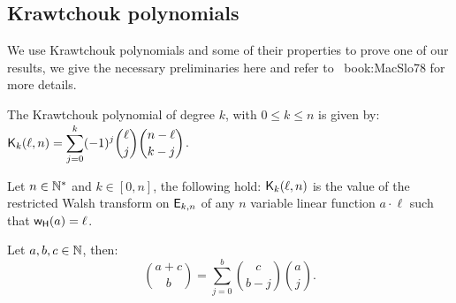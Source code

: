 \documentclass[11pt]{llncs}
\begin{document}
\subsection{Krawtchouk polynomials}
We use Krawtchouk polynomials and some of their properties to prove one of our results, we give the necessary preliminaries here and refer to \eg ~{book:MacSlo78} for more details.

\begin{definition}\label{def:Kraw}
	The Krawtchouk polynomial of degree $k$, with $0\leq k\leq n$ is given by: $ \displaystyle \mathsf{K}_{k}(\ell,n)=\sum_{j=0}^{k} (-1)^j \binom{\ell}{j} \binom{n-\ell}{k-j}$. 
\end{definition}


\begin{Prop}\label{prop:Kr}
	Let $n\in \mathbb{N}^*$ and $k\in [0,n]$, the following hold:
 $\mathsf{K}_{k}(\ell,n)$ is the value of the restricted Walsh transform on $\mathsf{E}_{k,n}$ of any $n$ variable linear function $a\cdot \ell$ such that $\mathsf{w_H}(a)=\ell$.
\end{Prop}


\begin{Prop}\label{prop:Vandermonde}
	Let $a,b,c \in \mathbb{N}$, then:
	\begin{equation*}
	\binom{a+c}{b}=\sum_{j=0}^b\binom{c}{b-j}  \binom{a}{j}.
	\end{equation*}
\end{Prop}



\fi


\end{document}
